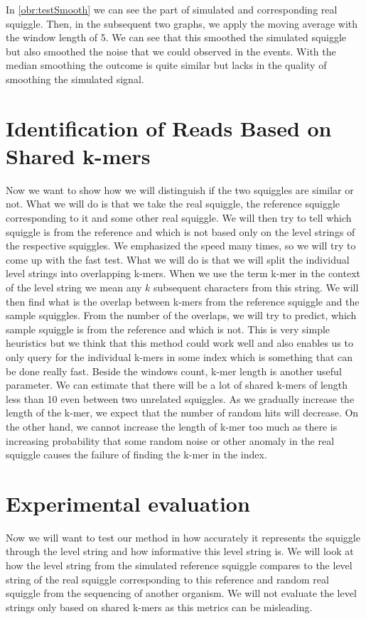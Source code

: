 In \ref{obr:testSmooth} we can see the part of simulated and corresponding real squiggle.
Then, in the subsequent two graphs, we apply the moving average with the window length
of 5. We can see that this smoothed the simulated squiggle but also smoothed the noise
that we could observed in the events. With the median smoothing the outcome is quite
similar but lacks in the quality of smoothing the simulated signal.

\section{Identification of Reads Based on Shared k-mers}

Now we want to show how we will distinguish if the two squiggles are similar or not.
What we will do is that we take the real squiggle, the reference squiggle corresponding to it and
some other real squiggle. We will then try to tell which squiggle is from the reference
and which is not based only on the level strings of the respective squiggles. We
emphasized the speed many times, so we will try to come up with the fast test.
What we will do is that we will split the individual level strings into overlapping k-mers.
When we use the term k-mer in the context of the level string we mean any $k$ subsequent
characters from this string. We will then find what is the overlap
between k-mers from the reference squiggle and the sample squiggles. From the number of the overlaps, we will try
to predict, which sample squiggle is from the reference and which is not. This is very
simple heuristics but we think that this method could work well and also enables us
to only query for the individual k-mers in some index which is something that can be done really fast.
Beside the windows count, k-mer length is another useful parameter. We can estimate
that there will be a lot of shared k-mers of length less than 10 even between two unrelated
squiggles. As we gradually increase the length of the k-mer, we expect that the number
of random hits will decrease. On the other hand, we cannot increase the length of k-mer
too much as there is increasing probability that some random noise or other anomaly
in the real squiggle causes the failure of finding the k-mer in the index.

\section{Experimental evaluation}

Now we will want to test our method in how accurately it represents the squiggle
through the level string and how informative this level string is. We will
look at how the level string from the simulated reference squiggle compares to the
level string of the real squiggle corresponding to this reference and random real squiggle
from the sequencing of another organism. We will not evaluate the level strings
only based on shared k-mers as this metrics can be misleading.

